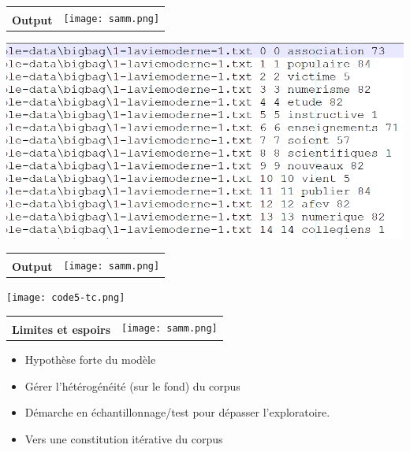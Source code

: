 \documentclass[12pt]{beamer}
\begin{document}
\begin{frame}
\begin{tabular}{b{7cm}l}
& \multirow{2}{*}{\texttt{[image: samm.png]}}\\ {\large \textbf{Output}}& 
\end{tabular}

\vspace{1.5cm}

\includegraphics[scale=0.25]{code4-mots.png}

\end{frame}

\begin{frame}
\begin{tabular}{b{7cm}l}
& \multirow{2}{*}{\texttt{[image: samm.png]}}\\ {\large \textbf{Output}}& 
\end{tabular}

\vspace{1.5cm}

\texttt{[image: code5-tc.png]}

\end{frame}


\begin{frame}

\begin{tabular}{b{7cm}l}
& \multirow{2}{*}{\texttt{[image: samm.png]}}\\ {\large \textbf{Limites et espoirs}}& 
\end{tabular}

\vspace{2cm}


\begin{itemize}
	\item Hypothèse forte du modèle
	\item Gérer l'hétérogénéité (sur le fond) du corpus
	\item Démarche en échantillonnage/test pour dépasser l'exploratoire.
	\item Vers une constitution itérative du corpus
\end{itemize}



\end{frame}
\end{document}
